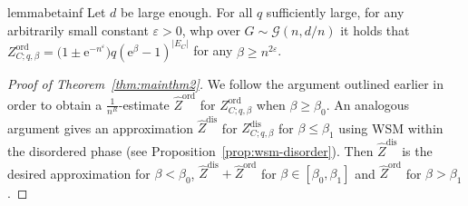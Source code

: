 \documentclass[11pt]{article}
\theoremstyle{plain}
\let\epsilon=\varepsilon
\newcommand{\emm}{\mathrm{e}}
\newcommand{\1}{\mathbb{1}}
\newcommand{\ord}{\mathrm{ord}}
\newcommand{\dis}{\mathrm{dis}}
\begin{document}
\begin{restatable}{lemma}{betainf}\label{lem:betainf}
Let $d$ be large enough. For all $q$ sufficiently large,  for any arbitrarily small constant $\epsilon>0$, whp over $G\sim \mathcal{G}(n,d/n)$ it holds that $Z^{\ord}_{C;q,\beta}=\big(1\pm \emm^{-n^{\epsilon}}) q (\emm^{\beta}-1)^{|E_C|}$  for any $\beta\geq n^{2\epsilon}$.
\end{restatable}
\begin{proof}[Proof of Theorem~\ref{thm:mainthm2}]
We follow the argument outlined earlier in order to obtain a $\frac{1}{n^R}$-estimate $\hat Z^{\ord}$ for $Z^{\ord}_{C;q,\beta}$ when $\beta\geq \beta_0$. An analogous argument gives an approximation  $\hat Z^{\dis}$ for $Z^{\dis}_{C;q,\beta}$ for $\beta\leq \beta_1$ using WSM within the disordered phase (see Proposition~\ref{prop:wsm-disorder}). Then $\hat Z^\dis$ is the desired approximation for $\beta< \beta_0$,  $\hat Z^\dis+\hat Z^\ord$   for $\beta\in [\beta_0,\beta_1]$ and  $\hat Z^\ord$ for $\beta>\beta_1$.  



\end{proof}
\end{document}
